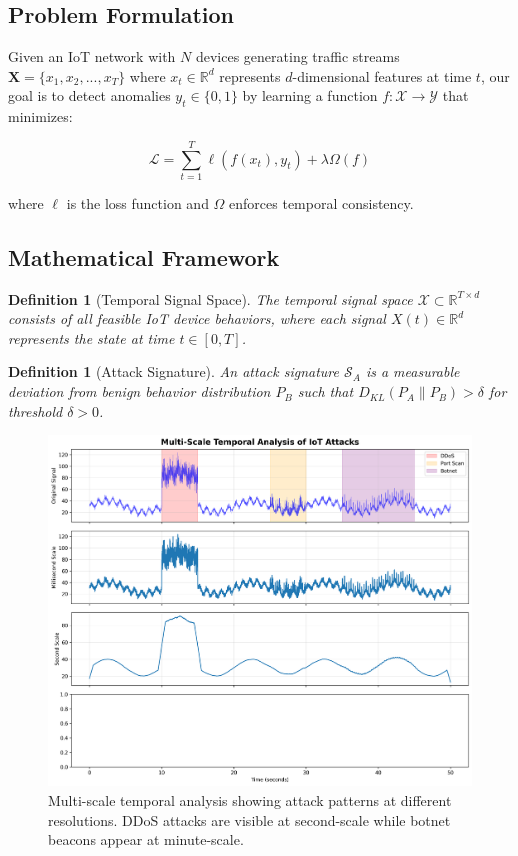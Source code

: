 \documentclass[10pt,conference]{IEEEtran}
\newtheorem{definition}[theorem]{Definition}
\begin{document}
\subsection{Problem Formulation}

Given an IoT network with $N$ devices generating traffic streams $\mathbf{X} = \{x_1, x_2, ..., x_T\}$ where $x_t \in \mathbb{R}^d$ represents $d$-dimensional features at time $t$, our goal is to detect anomalies $y_t \in \{0, 1\}$ by learning a function $f: \mathcal{X} \rightarrow \mathcal{Y}$ that minimizes:

\begin{equation}
\mathcal{L} = \sum_{t=1}^{T} \ell(f(x_t), y_t) + \lambda \Omega(f)
\end{equation}

where $\ell$ is the loss function and $\Omega$ enforces temporal consistency.

\subsection{Mathematical Framework}

\begin{definition}[Temporal Signal Space]
The temporal signal space $\mathcal{X} \subset \mathbb{R}^{T \times d}$ consists of all feasible IoT device behaviors, where each signal $X(t) \in \mathbb{R}^d$ represents the state at time $t \in [0, T]$.
\end{definition}

\begin{definition}[Attack Signature]
An attack signature $\mathcal{S}_A$ is a measurable deviation from benign behavior distribution $P_B$ such that $D_{KL}(P_A \| P_B) > \delta$ for threshold $\delta > 0$.
\end{definition}

\begin{figure}[!t]
\centering
\includegraphics[width=\columnwidth]{figures/multi_scale_analysis.png}
\caption{Multi-scale temporal analysis showing attack patterns at different resolutions. DDoS attacks are visible at second-scale while botnet beacons appear at minute-scale.}
\label{fig:multiscale}
\end{figure}
\end{document}
